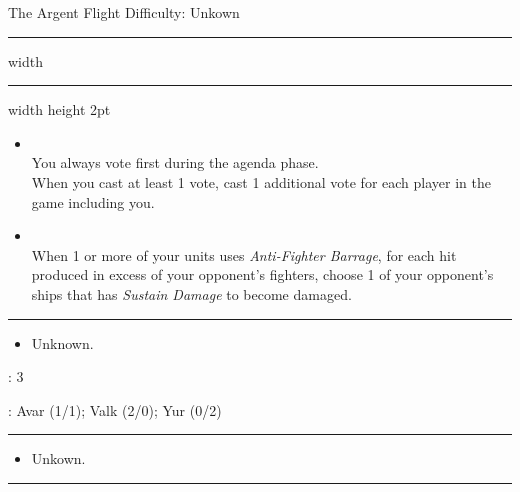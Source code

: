 {\handel \Huge The Argent Flight} \hfill {\Large Difficulty: Unkown} \vspace{-4pt}\\
\hrule width \hsize \kern 1mm \hrule width \hsize height 2pt


\begin{multicols}{2}


\begin{itemize}
\item {}\\
You always vote first during the agenda phase.\\
When you cast at least 1 vote, cast 1 additional vote for each player in the game including you.
\item {}\\
When 1 or more of your units uses \emph{Anti-Fighter Barrage}, for each hit produced in excess of your opponent's fighters, choose 1 of your opponent's ships that has \emph{Sustain Damage} to become damaged.
\end{itemize}


\vspace{-10pt}\rule{\hsize}{0.4pt}\vspace{5pt}


\vspace{-5pt}
\begin{multicols}{2}
\begin{itemize}
\item Unknown. %
\end{itemize}
\end{multicols}

\vspace{-5pt}
: 3

\vspace{2pt}
: Avar (1/1); Valk (2/0); Yur (0/2)

\rule{\hsize}{0.4pt}\vspace{5pt}


\begin{itemize}
\item Unkown. %
\end{itemize}

\vspace{-10pt}\rule{\hsize}{0.4pt}\vspace{5pt}


\end{multicols}
